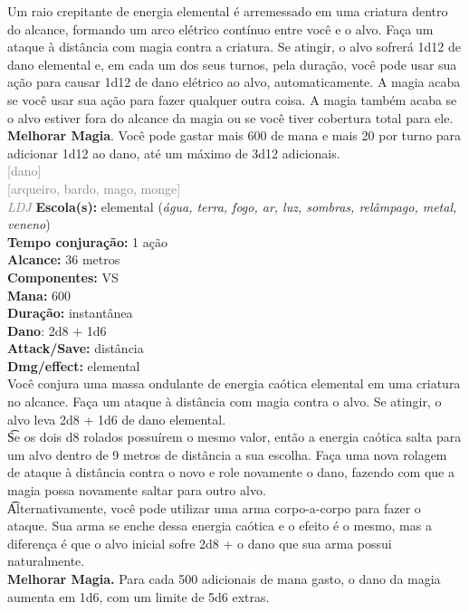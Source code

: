 \documentclass{RPG_Adventure}[2021/10/20]
\begin{document}
{\normalsize Um raio crepitante de energia elemental é arremessado em uma criatura dentro do alcance, formando um arco elétrico contínuo entre você e o alvo. Faça um ataque à distância com magia contra a criatura. Se atingir, o alvo sofrerá 1d12 de dano elemental e, em cada um dos seus turnos, pela duração, você pode usar sua ação para causar 1d12 de dano elétrico ao alvo, automaticamente. A magia acaba se você usar sua ação para fazer qualquer outra coisa. A magia também acaba se o alvo estiver fora do alcance da magia ou se você tiver cobertura total para ele.\\\t \textbf{Melhorar Magia}. Você pode gastar mais 600 de mana e mais 20 por turno para adicionar 1d12 ao dano, até um máximo de 3d12 adicionais.\\}
{\scriptsize \textcolor{gray}{[dano]\\}}
{\scriptsize \textcolor{gray}{[arqueiro, bardo, mago, monge]\\}}
{\tiny \textcolor{gray}{\textit{LDJ}}}
{\small \t \textbf{Escola(s):} elemental (\textit{água, terra, fogo, ar, luz, sombras, relâmpago, metal, veneno})\\\t \textbf{Tempo conjuração:} 1 ação\\\t \textbf{Alcance:} 36 metros\\\t \textbf{Componentes:} VS\\\t \textbf{Mana:} 600\\\t \textbf{Duração:} instantânea\\\t \textbf{Dano}: 2d8 + 1d6\\\t \textbf{Attack/Save:} distância\\\t \textbf{Dmg/effect:} elemental\\}
{\normalsize Você conjura uma massa ondulante de energia caótica elemental em uma criatura no alcance. Faça um ataque à distância com magia contra o alvo. Se atingir, o alvo leva 2d8 + 1d6 de dano elemental.\\\t Se os dois d8 rolados possuírem o mesmo valor, então a energia caótica salta para um alvo dentro de 9 metros de distância a sua escolha. Faça uma nova rolagem de ataque à distância contra o novo e role novamente o dano, fazendo com que a magia possa novamente saltar para outro alvo.\\\t Alternativamente, você pode utilizar uma arma corpo-a-corpo para fazer o ataque. Sua arma se enche dessa energia caótica e o efeito é o mesmo, mas a diferença é que o alvo inicial sofre 2d8 + o dano que sua arma possui naturalmente.\\\t \textbf{Melhorar Magia.} Para cada 500 adicionais de mana gasto, o dano da magia aumenta em 1d6, com um limite de 5d6 extras.\\}
\end{document}
